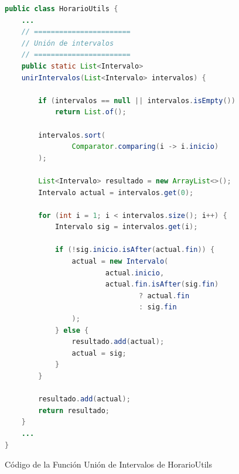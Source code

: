 \begin{figure}[H]
    \centering
    \begin{minipage}{0.9\textwidth}
    \caption{Código de la Función Unión de Intervalos de HorarioUtils}
    \label{code:HorarioUtils-UnirIntervalos}
    \vspace{-0.2cm}
    \begin{lstlisting}[language=Java, basicstyle=\scriptsize\ttfamily]
public class HorarioUtils {
    ...
    // =======================
    // Unión de intervalos
    // =======================
    public static List<Intervalo>
    unirIntervalos(List<Intervalo> intervalos) {

        if (intervalos == null || intervalos.isEmpty())
            return List.of();

        intervalos.sort(
                Comparator.comparing(i -> i.inicio)
        );

        List<Intervalo> resultado = new ArrayList<>();
        Intervalo actual = intervalos.get(0);

        for (int i = 1; i < intervalos.size(); i++) {
            Intervalo sig = intervalos.get(i);

            if (!sig.inicio.isAfter(actual.fin)) {
                actual = new Intervalo(
                        actual.inicio,
                        actual.fin.isAfter(sig.fin)
                                ? actual.fin
                                : sig.fin
                );
            } else {
                resultado.add(actual);
                actual = sig;
            }
        }

        resultado.add(actual);
        return resultado;
    }
    ...
}
    \end{lstlisting}
    \end{minipage}
\end{figure}

